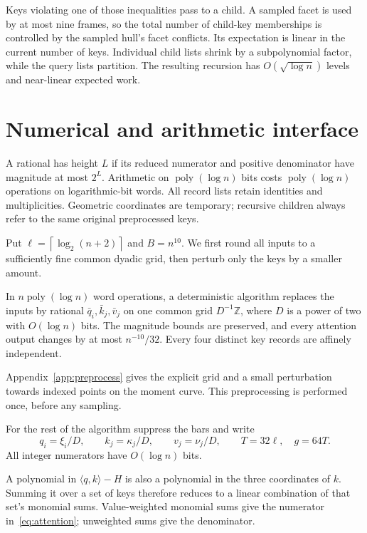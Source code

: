 \documentclass[notab,a4paper,UKenglish,numberwithinsect]{socg-lipics-v2021}
\newcommand{\Z}{\mathbb Z}
\newcommand{\ip}[2]{\langle #1,#2\rangle}
\newcommand{\poly}{\operatorname{poly}}
\newcommand{\ceil}[1]{\left\lceil #1\right\rceil}
\begin{document}
Keys violating one of those inequalities pass to a child. A sampled facet is used by at most nine frames, so the total number of child-key memberships is controlled by the sampled hull's facet conflicts. Its expectation is linear in the current number of keys. Individual child lists shrink by a subpolynomial factor, while the query lists partition. The resulting recursion has $O(\sqrt{\log n})$ levels and near-linear expected work.

\section{Numerical and arithmetic interface}\label{sec:interface}
A rational has height $L$ if its reduced numerator and positive denominator have magnitude at most $2^L$. Arithmetic on $\poly(\log n)$ bits costs $\poly(\log n)$ operations on logarithmic-bit words. All record lists retain identities and multiplicities. Geometric coordinates are temporary; recursive children always refer to the same original preprocessed keys.

Put $\ell=\ceil{\log_2(n+2)}$ and $B=n^{10}$. We first round all inputs to a sufficiently fine common dyadic grid, then perturb only the keys by a smaller amount.

\begin{lemma}\label{lem:preprocess}
In $n\poly(\log n)$ word operations, a deterministic algorithm replaces the inputs by rational $\bar q_i,\bar k_j,\bar v_j$ on one common grid $D^{-1}\Z$, where $D$ is a power of two with $O(\log n)$ bits. The magnitude bounds are preserved, and every attention output changes by at most $n^{-10}/32$. Every four distinct key records are affinely independent.
\end{lemma}

Appendix~\ref{app:preprocess} gives the explicit grid and a small perturbation towards indexed points on the moment curve. This preprocessing is performed once, before any sampling.

For the rest of the algorithm suppress the bars and write
\[
 q_i=\xi_i/D,\qquad k_j=\kappa_j/D,\qquad v_j=\nu_j/D,
 \qquad T=32\ell,\quad g=64T.
\]
All integer numerators have $O(\log n)$ bits.

A polynomial in $\ip qk-H$ is also a polynomial in the three coordinates of $k$. Summing it over a set of keys therefore reduces to a linear combination of that set's monomial sums. Value-weighted monomial sums give the numerator in~\eqref{eq:attention}; unweighted sums give the denominator.
\end{document}
